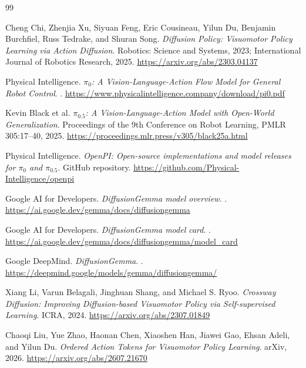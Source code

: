 \documentclass[11pt]{article}
\begin{document}
\newpage
\begin{thebibliography}{99}

Cheng Chi, Zhenjia Xu, Siyuan Feng, Eric Cousineau, Yilun Du, Benjamin Burchfiel, Russ Tedrake, and Shuran Song.
\newblock \textit{Diffusion Policy: Visuomotor Policy Learning via Action Diffusion}.
\newblock Robotics: Science and Systems, 2023; International Journal of Robotics Research, 2025.
\newblock \url{https://arxiv.org/abs/2303.04137}

Physical Intelligence.
\newblock \textit{$\pi_0$: A Vision-Language-Action Flow Model for General Robot Control}.
.
\newblock \url{https://www.physicalintelligence.company/download/pi0.pdf}

Kevin Black et al.
\newblock \textit{$\pi_{0.5}$: A Vision-Language-Action Model with Open-World Generalization}.
\newblock Proceedings of the 9th Conference on Robot Learning, PMLR 305:17--40, 2025.
\newblock \url{https://proceedings.mlr.press/v305/black25a.html}

Physical Intelligence.
\newblock \textit{OpenPI: Open-source implementations and model releases for $\pi_0$ and $\pi_{0.5}$}.
\newblock GitHub repository.
\newblock \url{https://github.com/Physical-Intelligence/openpi}

Google AI for Developers.
\newblock \textit{DiffusionGemma model overview}.
.
\newblock \url{https://ai.google.dev/gemma/docs/diffusiongemma}

Google AI for Developers.
\newblock \textit{DiffusionGemma model card}.
.
\newblock \url{https://ai.google.dev/gemma/docs/diffusiongemma/model_card}

Google DeepMind.
\newblock \textit{DiffusionGemma}.
.
\newblock \url{https://deepmind.google/models/gemma/diffusiongemma/}

Xiang Li, Varun Belagali, Jinghuan Shang, and Michael S. Ryoo.
\newblock \textit{Crossway Diffusion: Improving Diffusion-based Visuomotor Policy via Self-supervised Learning}.
\newblock ICRA, 2024.
\newblock \url{https://arxiv.org/abs/2307.01849}

Chaoqi Liu, Yue Zhao, Haonan Chen, Xiaoshen Han, Jiawei Gao, Ehsan Adeli, and Yilun Du.
\newblock \textit{Ordered Action Tokens for Visuomotor Policy Learning}.
\newblock arXiv, 2026.
\newblock \url{https://arxiv.org/abs/2607.21670}


\end{thebibliography}
\end{document}
